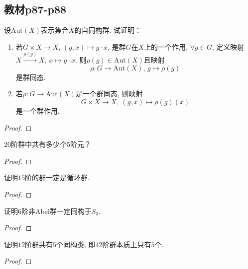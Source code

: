 \subsection{教材p87-p88}

\begin{problem}
    设$\mathrm{Aut}(X)$表示集合$X$的自同构群. 试证明：
\begin{enumerate}[(1)]
    \item 若$G \times X \to X,\, (g, x) \mapsto g \cdot x$,
是群$G$在$X$上的一个作用, $\forall g \in G$, 定义映射
$X \xrightarrow{\rho(g)} X$, $x \mapsto g \cdot x$.
则$\rho(g) \in \mathrm{Aut}(X)$且映射
\[
    \rho:G \to \mathrm{Aut}(X),\, g \mapsto \rho(g)
\]
是群同态.
    \item 若$\rho:G \to \mathrm{Aut}(X)$是一个群同态, 则映射
\[
    G \times X \to X,\: (g, x) \mapsto \rho(g)(x)
\]
是一个群作用.
\end{enumerate}
\end{problem}

\begin{proof}
    
\end{proof}

\begin{problem}
    $20$阶群中共有多少个$5$阶元？
\end{problem}

\begin{proof}
    
\end{proof}

\begin{problem}
    证明$15$阶的群一定是循环群.
\end{problem}

\begin{proof}
    
\end{proof}

\begin{problem}
    证明$6$阶非Abel群一定同构于$S_3$.
\end{problem}

\begin{proof}
    
\end{proof}

\begin{problem}
    证明$12$阶群共有$5$个同构类, 即$12$阶群本质上只有$5$个.
\end{problem}

\begin{proof}
    
\end{proof}


